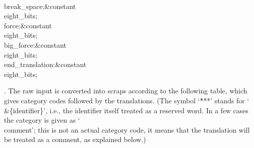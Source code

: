 \\{break\_space}\?:\?\&{constant}\8\\{eight\_bits}\?\K{}\?;\6
\\{force}\?:\?\&{constant}\8\\{eight\_bits}\?\K{}\?;\6
\\{big\_force}\?:\?\&{constant}\8\\{eight\_bits}\?\K{}\?;\6
\\{end\_translation}\?:\?\&{constant}\8\\{eight\_bits}\?\K{}\?;%
\par
\fi

. The raw input is converted into scraps according to the following table,
which gives category codes followed by the translations.
\def\stars {\.{***}}%
(The symbol `\stars' stands for `\.{\\\&\{{\rm identifier}\}}',
i.e., the identifier itself treated as a reserved word. In a few cases the
category is given as `\\{comment}'; this is not an actual category code, it
means that the translation will be treated as a comment, as explained
below.)


